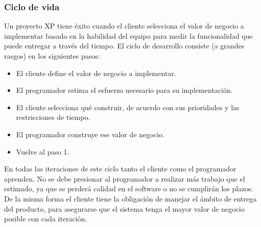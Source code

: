 


\subsubsection{Ciclo de vida}

\setlength{\parskip}{5mm}
Un proyecto XP tiene éxito cuando el cliente selecciona el valor de negocio a implementar basado en la habilidad del equipo para medir la funcionalidad que puede entregar a través del tiempo. El ciclo de desarrollo consiste (a grandes rasgos) en los siguientes pasos:

\begin{itemize}

	\item El cliente define el valor de negocio a implementar.

	\item El programador estima el esfuerzo necesario para su implementación.

	\item El cliente selecciona qué construir, de acuerdo con sus prioridades y las restricciones de tiempo.

	\item El programador construye ese valor de negocio.

	\item Vuelve al paso 1.

\end{itemize}
    
En todas las iteraciones de este ciclo tanto el cliente como el programador aprenden. No se debe presionar al programador a realizar más trabajo que el estimado, ya que se perderá calidad en el software o no se cumplirán los plazos. De la misma forma el cliente tiene la obligación de manejar el ámbito de entrega del producto, para asegurarse que el sistema tenga el mayor valor de negocio posible con cada iteración.

